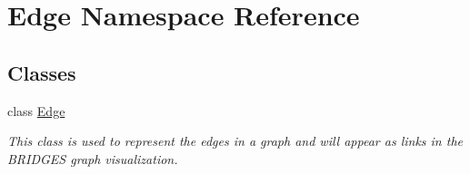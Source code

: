 \hypertarget{namespace_edge}{}\section{Edge Namespace Reference}
\label{namespace_edge}
\subsection*{Classes}
\begin{DoxyCompactItemize}
\item 
class \hyperlink{class_edge_1_1_edge}{Edge}
\begin{DoxyCompactList}\small\item\em This class is used to represent the edges in a graph and will appear as links in the B\+R\+I\+D\+G\+E\+S graph visualization. \end{DoxyCompactList}\end{DoxyCompactItemize}
